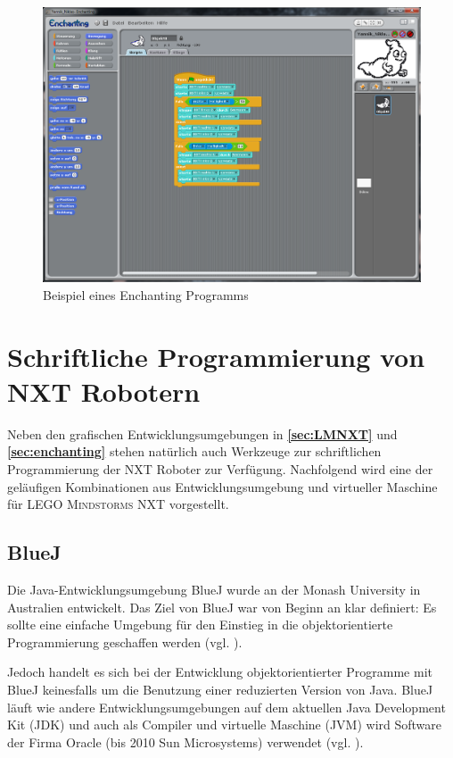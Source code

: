 \documentclass[paper=a4, DIV=calc, BCOR=12mm, twoside=on, onecolumn=on, open = right, titlepage =on, parskip =half-, headsepline = on, footsepline = off, chapterprefix = off, appendixprefix = on, fontsize = 12pt, numbers = noenddot, abstract = on]{scrbook}
\begin{document}
\begin{figure}[htbp]
\centering
\includegraphics[width=\textwidth]{images/Beispielprogramm_Enchanting.png} 
\caption{Beispiel eines Enchanting Programms}
\label{fig:Bsp Enchanting}
\end{figure}

\newpage

\section{Schriftliche Programmierung von NXT Robotern}
\label{sec:bluejetc}
Neben den grafischen Entwicklungsumgebungen in \textbf{\ref{sec:LMNXT}} und \textbf{\ref{sec:enchanting}} stehen natürlich auch Werkzeuge zur schriftlichen Programmierung der NXT Roboter zur Verfügung. Nachfolgend wird eine der geläufigen Kombinationen aus Entwicklungsumgebung und virtueller Maschine für \textsc{LEGO Mindstorms} NXT vorgestellt. 

\subsection{BlueJ}
\label{sec:bluej}
Die Java-Entwicklungsumgebung BlueJ wurde an der Monash University in Australien entwickelt. Das Ziel von BlueJ war von Beginn an klar definiert: Es sollte eine einfache Umgebung für den Einstieg in die objektorientierte Programmierung geschaffen werden (vgl. \cite[S.14]{barnes:03}).

Jedoch handelt es sich bei der Entwicklung objektorientierter Programme mit BlueJ keinesfalls um die Benutzung einer reduzierten Version von Java. BlueJ läuft wie andere Entwicklungsumgebungen auf dem aktuellen Java Development Kit (JDK) und auch als Compiler und virtuelle Maschine (JVM) wird Software der Firma Oracle (bis 2010 Sun Microsystems) verwendet (vgl. \cite[S.15]{barnes:03}).
\end{document}
